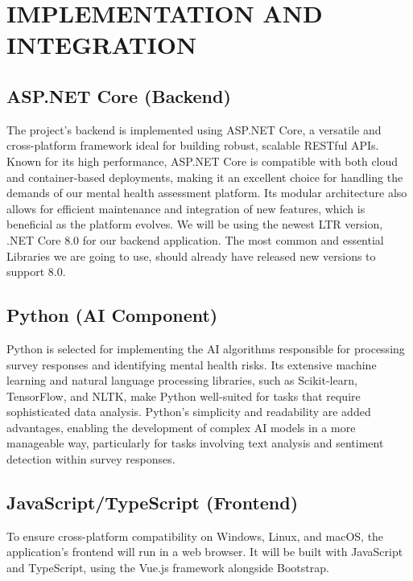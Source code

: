 \documentclass[conference]{IEEEtran}
\begin{document}
\section{IMPLEMENTATION AND INTEGRATION}

\subsection {ASP.NET Core (Backend)}


The project’s backend is implemented using ASP.NET Core, 
    a versatile and cross-platform framework ideal for building 
    robust, scalable RESTful APIs. Known for its high performance, 
    ASP.NET Core is compatible with both cloud and container-based 
    deployments, making it an excellent choice for handling the 
    demands of our mental health assessment platform. Its modular 
    architecture also allows for efficient maintenance and 
    integration of new features, which is beneficial as the 
    platform evolves. We will be using the newest LTR version, 
    .NET Core 8.0 for our backend application. The most common and 
    essential Libraries we are going to use, should already have 
    released new versions to support 8.0.
\newline


\subsection {Python (AI Component)}

Python is selected for implementing the AI algorithms 
responsible for processing survey responses and 
identifying mental health risks. Its extensive machine 
learning and natural language processing libraries, 
such as Scikit-learn, TensorFlow, and NLTK, make Python 
well-suited for tasks that require sophisticated data 
analysis. Python’s simplicity and readability are added 
advantages, enabling the development of complex AI 
models in a more manageable way, particularly for tasks 
involving text analysis and sentiment detection within 
survey responses.
\newline


\subsection {JavaScript/TypeScript (Frontend)}

To ensure cross-platform compatibility on Windows, Linux, 
and macOS, the application's frontend will run in a web 
browser. It will be built with JavaScript and TypeScript, 
using the Vue.js framework alongside Bootstrap. 
\newline
\end{document}
